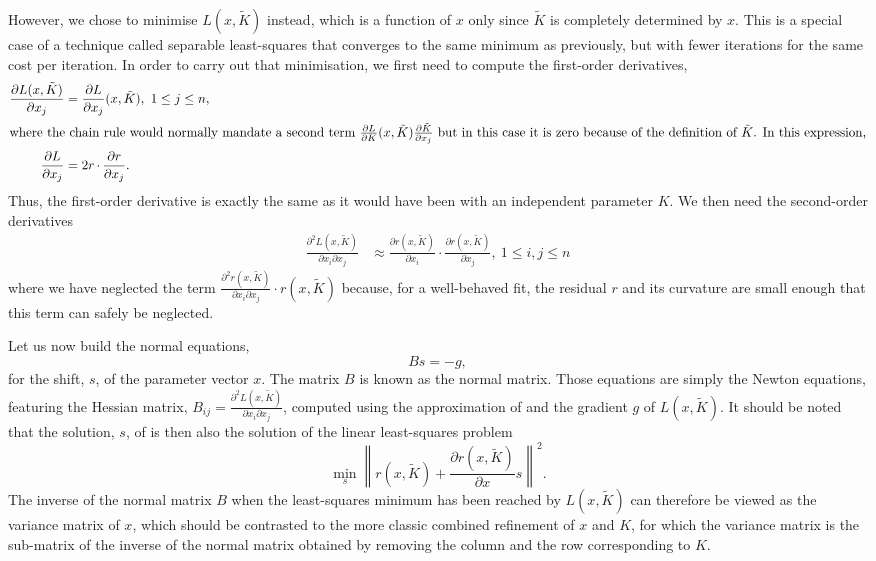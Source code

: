 \documentclass[pdf]{iucr}
\newcommand{\norm}[1]{\left\| #1 \right\|}
\DeclareMathOperator{\dotprod}{\cdot}
\newcommand{\partialder}[2]{\frac{\partial #1}{\partial #2}}
\newcommand{\partialderxy}[3]{\frac{\partial^2 #1}{\partial #2 \partial #3}}
\begin{document}
However, we chose to minimise $L(x, \tilde{K})$ instead, which is a function of $x$ only since $\tilde{K}$ is completely determined by $x$. This is a special case of a technique called separable least-squares  that  converges to the same minimum as previously, but with fewer iterations for the same cost per iteration. In order to carry out that minimisation, we first need to compute the first-order derivatives,
\begin{align}
\partialder{L(x, \tilde{K})}{x_j} &= \partialder{L}{x_j}(x, \tilde{K}),\ 1 \le j \le n, \\
\shortintertext{where the chain rule would normally mandate a second term $\partialder{L}{K}(x, \tilde{K})\partialder{\tilde{K}}{x_j}$ but in this case it is zero because of the definition of $\tilde{K}$. In this expression,}
\partialder{L}{x_j} &= 2 r \dotprod \partialder{r}{x_j}.
\end{align}
Thus, the first-order derivative is exactly the same as it would have been with an independent parameter $K$. We then need the second-order derivatives
\begin{align}
\partialderxy{L(x, \tilde{K})}{x_i}{x_j} &\approx \partialder{r(x, \tilde{K})}{x_i} \dotprod \partialder{r(x, \tilde{K})}{x_j},\ 1 \le i,j \le n
\label{eqn:gaussleastsquares}
\end{align}
where we have neglected the term $\partialderxy{r(x, \tilde{K})}{x_i}{x_j} \dotprod r(x, \tilde{K})$ because, for a well-behaved fit, the residual $r$ and its curvature are small enough that this term can safely be neglected.

Let us now build the normal equations, 
\begin{equation}
\label{eqn:gaussnewtoneq}
Bs = -g,
\end{equation}
for the shift, $s$, of the parameter vector $x$. The matrix $B$ is known as the normal matrix. Those equations are simply the Newton equations, featuring the Hessian matrix, $B_{ij} = \partialderxy{L(x, \tilde{K})}{x_i}{x_j}$, computed using the approximation of  and the gradient $g$ of $L(x, \tilde{K})$. It should be noted that the solution, $s$, of  is then also the solution of the linear least-squares problem
\begin{equation}
\label{eqn:gaussnewtonaslinearls}
\min_s \norm{r(x, \tilde{K}) + \partialder{r(x, \tilde{K})}{x} s}^2.
\end{equation}
The inverse of the normal matrix $B$ when the least-squares minimum has been reached by $L(x, \tilde{K})$ can therefore be viewed as the variance matrix of $x$, which should be contrasted to the more classic combined refinement of $x$ and $K$, for which the variance matrix is the sub-matrix of the inverse of the normal matrix obtained by removing the column and the row corresponding to $K$. 
\end{document}
